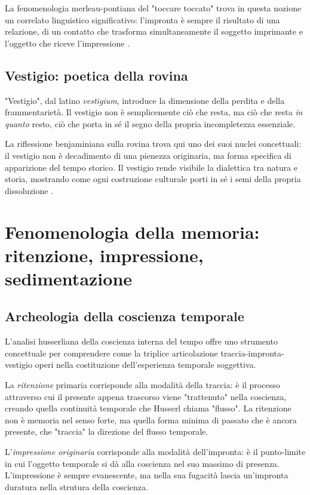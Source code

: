 \documentclass{gs}
\begin{document}
La fenomenologia merleau-pontiana del "toccare toccato" trova in questa nozione un correlato linguistico significativo: l'impronta è sempre il risultato di una relazione, di un contatto che trasforma simultaneamente il soggetto imprimante e l'oggetto che riceve l'impressione \cite{merleau-ponty1945}.

\subsection{Vestigio: poetica della rovina}

"Vestigio", dal latino \textit{vestigium}, introduce la dimensione della perdita e della frammentarietà. Il vestigio non è semplicemente ciò che resta, ma ciò che resta \textit{in quanto} resto, ciò che porta in sé il segno della propria incompletezza essenziale.

La riflessione benjaminiana sulla rovina trova qui uno dei suoi nuclei concettuali: il vestigio non è decadimento di una pienezza originaria, ma forma specifica di apparizione del tempo storico. Il vestigio rende visibile la dialettica tra natura e storia, mostrando come ogni costruzione culturale porti in sé i semi della propria dissoluzione \cite{benjamin1928}.

\section{Fenomenologia della memoria: ritenzione, impressione, sedimentazione}

\subsection{Archeologia della coscienza temporale}

L'analisi husserliana della coscienza interna del tempo \cite{husserl1928} offre uno strumento concettuale per comprendere come la triplice articolazione traccia-impronta-vestigio operi nella costituzione dell'esperienza temporale soggettiva.

La \textit{ritenzione} primaria corrisponde alla modalità della traccia: è il processo attraverso cui il presente appena trascorso viene "trattenuto" nella coscienza, creando quella continuità temporale che Husserl chiama "flusso". La ritenzione non è memoria nel senso forte, ma quella forma minima di passato che è ancora presente, che "traccia" la direzione del flusso temporale.

L'\textit{impressione originaria} corrisponde alla modalità dell'impronta: è il punto-limite in cui l'oggetto temporale si dà alla coscienza nel suo massimo di presenza. L'impressione è sempre evanescente, ma nella sua fugacità lascia un'impronta duratura nella strutura della coscienza.
\end{document}
